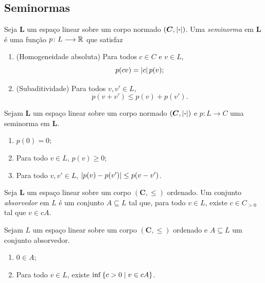 \subsection{Seminormas}

\begin{defi}
Seja $\bm L$ um espaço linear sobre um corpo normado $(\bm C,\left\vert{\bm{\cdot}}\right\vert)$. Uma \emph{seminorma} em $\bm L$ é uma função $p\colon L \longrightarrow \mathbb{R}$
que satisfaz
	\begin{enumerate}
	\item (Homogeneidade absoluta) Para todos $c \in C$ e $v \in L$,
		\begin{equation*}
		p(cv) = \left\vert{c}\right\vert p(v);
		\end{equation*}
	\item (Subaditividade) Para todos $v,v' \in L$,
		\begin{equation*}
		p(v + v') \leq p(v) + p(v').
		\end{equation*}
	\end{enumerate}
\end{defi}

\begin{prop}
Sejam $\bm L$ um espaço linear sobre um corpo normado $(\bm C,\left\vert{\bm{\cdot}}\right\vert)$ e $p\colon L \to C$ uma seminorma em $\bm L$.
	\begin{enumerate}
	\item $p(0)=0$;
	\item Para todo $v \in L$, $p(v) \geq 0$;
	\item Para todo $v,v' \in L$, $\left\vert{p(v)-p(v')}\right\vert \leq p(v-v')$.
	\end{enumerate}
\end{prop}

\begin{defi}
Seja $\bm L$ um espaço linear sobre um corpo $(\bm C,\leq)$ ordenado. Um conjunto \emph{absorvedor} em $L$ é um conjunto $A \subseteq L$ tal que, para todo $v \in L$, existe $c \in C_{>0}$ tal que $v \in cA$.
\end{defi}

\begin{prop}
Sejam $L$ um espaço linear sobre um corpo $(\bm C,\leq)$ ordenado e $A \subseteq L$ um conjunto absorvedor.
	\begin{enumerate}
	\item $0 \in A$;
	\item Para todo $v \in L$, existe $\inf\left\{c>0 \;\middle\vert\; v \in cA \right\}$.
	\end{enumerate}
\end{prop}

